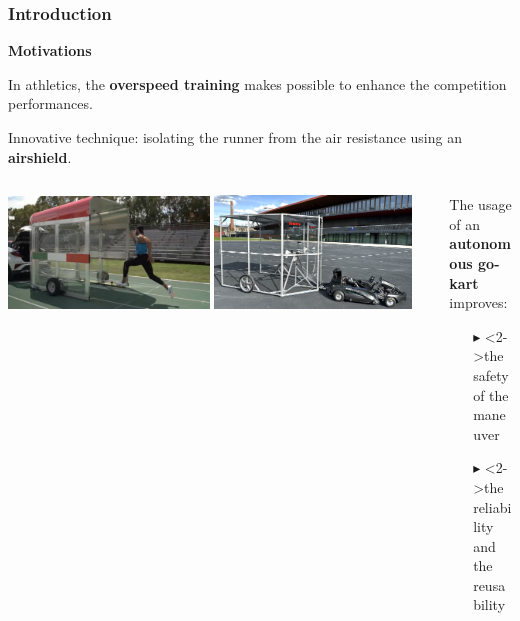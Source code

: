 \documentclass[9pt, aspectratio=169]{beamer}
\begin{document}
\begin{frame}
\vspace{0.05cm}
\frametitle{Introduction}
\vspace{0.2cm}
\textcolor{emph@Thesis}{\textbf{\small{Motivations}}} \\
\vspace{0.2cm}

In athletics, the \textbf{overspeed training} makes possible to enhance the competition performances.

Innovative technique: isolating the runner from the air resistance using an \textbf{airshield}.

\begin{columns}
\hspace{0.2cm}
\begin{column}{0.62\textwidth}
\vspace{0.2cm}
	\begin{center}
  		\includegraphics[width=0.48\textwidth]{Jacobs} 
		\onslide <2,3>\includegraphics[width=0.47\textwidth]{Windshield} 
	\end{center}
\end{column}
\begin{column}{0.38\textwidth}
The usage of an \textbf{autonomous go-kart} improves:
	\begin{itemize}
		\footnotesize
		\item[$\blacktriangleright$] <2->the safety of the maneuver
		\item[$\blacktriangleright$] <2->the reliability and the reusability 
	\end{itemize}
\end{column}
\end{columns}
\vspace{0.7cm}


\end{frame}
\end{document}
